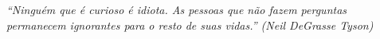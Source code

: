 
\renewcommand{\epigraphname}{EPÍGRAFE}

\begin{epigrafe}

\textit{``Ninguém que é curioso é idiota. As pessoas que não fazem perguntas permanecem ignorantes para o resto de suas vidas.'' (Neil DeGrasse Tyson)}

\end{epigrafe}


